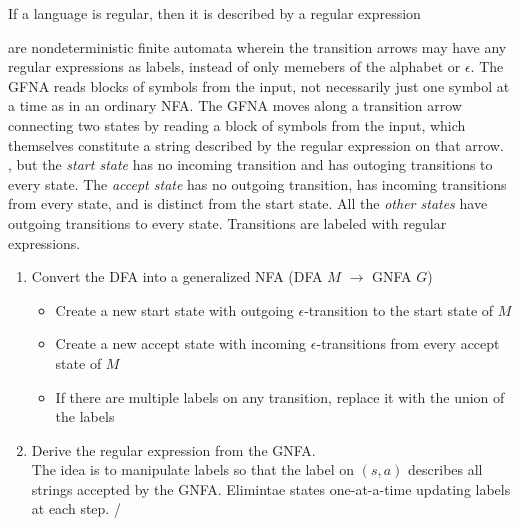 \documentclass{article}
\begin{document}
\begin{lemma}
  If a language is regular, then it is described by a regular expression
\end{lemma}

\begin{definition}
  are nondeterministic finite automata wherein the transition arrows may have any regular expressions as labels, instead of only memebers of the alphabet or $\epsilon$. The GFNA reads blocks of symbols from the input, not necessarily just one symbol at a time as in an ordinary NFA. The GFNA moves along a transition arrow connecting two states by reading a block of symbols from the input, which themselves constitute a string described by the regular expression on that arrow. \\ 

  , but the \emph{start state} has no incoming transition and has outoging transitions to every state. The \emph{accept state} has no outgoing transition, has incoming transitions from every state, and is distinct from the start state. All the \emph{other states} have outgoing transitions to every state. Transitions are labeled with regular expressions. 
\end{definition}

\begin{definition}
  \begin{enumerate}
    \item Convert the DFA into a generalized NFA (DFA $M$ $\rightarrow$ GNFA $G$)
      \begin{itemize}
        \item Create a new start state with outgoing $\epsilon$-transition to the start state of $M$ 
        \item Create a new accept state with incoming $\epsilon$-transitions from every accept state of $M$ 
        \item If there are multiple labels on any transition, replace it with the union of the labels
      \end{itemize}
    \item Derive the regular expression from the GNFA. \\ 
      The idea is to manipulate labels so that the label on $(s,a)$ describes all strings accepted by the GNFA. Elimintae states one-at-a-time updating labels at each step. /
  \end{enumerate}
\end{definition}
\end{document}
